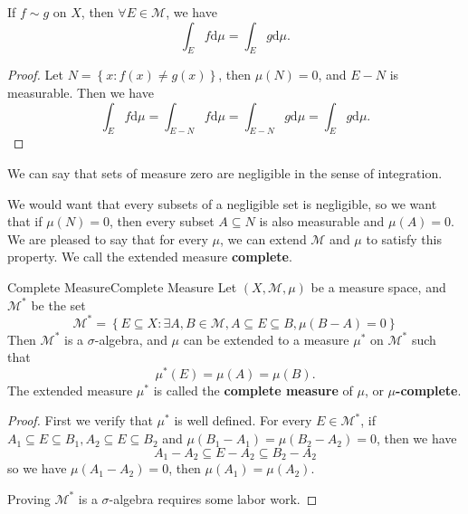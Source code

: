 \documentclass[../main.tex]{subfiles}
\begin{document}
If $f\sim g$ on $X$, then $\forall E\in \mathcal{M}$, we have
\begin{equation*}
	\int_E f \mathrm{d} \mu = \int_E g \mathrm{d} \mu.
\end{equation*}
\begin{proof}
	Let $N = \left\{ x: f(x)\neq g(x) \right\}$, then $\mu(N)=0$, and $E-N$ is measurable. Then we have
	\begin{equation*}
		\int_E f \mathrm{d} \mu = \int_{E-N} f \mathrm{d} \mu = \int_{E-N} g \mathrm{d} \mu = \int_E g \mathrm{d} \mu.
	\end{equation*}
\end{proof}
We can say that sets of measure zero are negligible in the sense of integration.

We would want that every subsets of a negligible set is negligible, so we want that if $\mu(N)=0$, then every subset $A\subseteq N$ is also measurable and $\mu(A)=0$. We are pleased to say that for every $\mu$, we can extend $\mathcal{M}$ and $\mu$ to satisfy this property. We call the extended measure \textbf{complete}.

\begin{theorem}{Complete Measure}{Complete Measure}
	Let $(X, \mathcal{M}, \mu)$ be a measure space, and $\mathcal{M}^*$ be the set
	\begin{equation*}
	\mathcal{M}^* = \left\{ E \subseteq X: \exists A,B\in \mathcal{M}, A \subseteq E \subseteq B, \mu(B-A)=0 \right\}
	\end{equation*}
	Then $\mathcal{M}^*$ is a $\sigma$-algebra, and $\mu$ can be extended to a measure $\mu^*$ on $\mathcal{M}^*$ such that
	\begin{equation*}
	\mu^*(E) = \mu(A) = \mu(B).
	\end{equation*}
	The extended measure $\mu^*$ is called the \textbf{complete measure} of $\mu$, or \textbf{$\mu$-complete}.
\end{theorem}
\begin{proof}
	First we verify that $\mu^*$ is well defined. For every $E\in \mathcal{M}^*$, if $A_1 \subseteq E \subseteq B_1, A_2 \subseteq E \subseteq B_2$ and $\mu(B_1-A_1)=\mu(B_2-A_2)=0$, then  we have
	\begin{equation*}
	A_1-A_2 \subseteq E-A_2 \subseteq B_2-A_2
	\end{equation*}
	so we have $\mu(A_1-A_2)=0$, then $\mu(A_1)=\mu(A_2)$.

	Proving $\mathcal{M}^*$ is a $\sigma$-algebra requires some labor work.
\end{proof}
\end{document}
